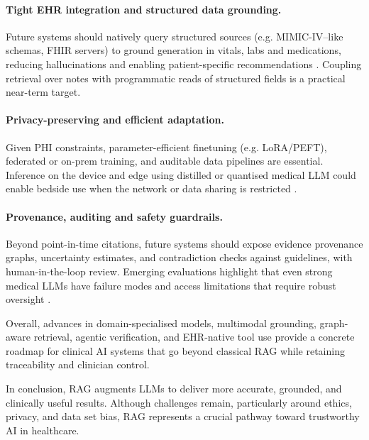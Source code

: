 \paragraph{Tight EHR integration and structured data grounding.}
Future systems should natively query structured sources (e.g. MIMIC-IV–like schemas, FHIR servers) to ground generation in vitals, labs and medications, reducing hallucinations and enabling patient-specific recommendations \citep{yang2022gatortron}. Coupling retrieval over notes with programmatic reads of structured fields is a practical near-term target.

\paragraph{Privacy-preserving and efficient adaptation.}
Given PHI constraints, parameter-efficient finetuning (e.g. LoRA/PEFT), federated or on-prem training, and auditable data pipelines are essential. Inference on the device and edge using distilled or quantised medical LLM could enable bedside use when the network or data sharing is restricted \citep{chen2023meditron}.

\paragraph{Provenance, auditing and safety guardrails.}
Beyond point-in-time citations, future systems should expose evidence provenance graphs, uncertainty estimates, and contradiction checks against guidelines, with human-in-the-loop review. Emerging evaluations highlight that even strong medical LLMs have failure modes and access limitations that require robust oversight \citep{nature2024evallimits}.

Overall, advances in domain-specialised models, multimodal grounding, graph-aware retrieval, agentic verification, and EHR-native tool use provide a concrete roadmap for clinical AI systems that go beyond classical RAG while retaining traceability and clinician control.

In conclusion, RAG augments LLMs to deliver more accurate, grounded, and clinically useful results. Although challenges remain, particularly around ethics, privacy, and data set bias, RAG represents a crucial pathway toward trustworthy AI in healthcare.
